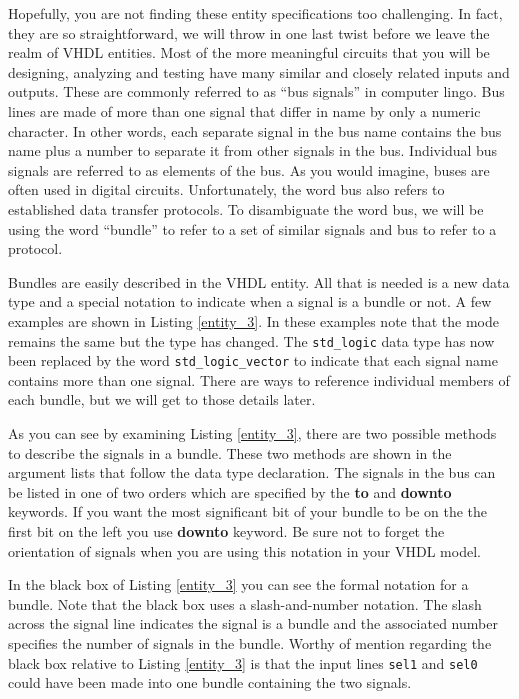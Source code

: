 Hopefully, you are not finding these entity specifications too challenging. In fact, they are so straightforward, we will throw in one last twist before we leave the realm of VHDL entities. Most of the more meaningful circuits that you will be designing, analyzing and testing have many similar and closely related inputs and outputs. These are commonly referred to as ``bus signals'' in computer lingo. Bus lines are made of more than one signal that differ in name by only a numeric character. In other words, each separate signal in the bus name contains the bus name plus a number to separate it from other signals in the bus. Individual bus signals are referred to as elements of the bus. As you would imagine, buses are often used in digital circuits. Unfortunately, the word bus also refers to established data transfer protocols. To disambiguate the word bus, we will be using the word ``bundle'' to refer to a set of similar signals and bus to refer to a protocol.

Bundles are easily described in the VHDL entity. All that is needed is a new data type and a special notation to indicate when a signal is a bundle or not. A few examples are shown in Listing \ref{entity_3}. In these examples note that the mode remains the same but the type has changed. The \texttt{std\_logic} data type has now been replaced by the word \texttt{std\_logic\_vector} to indicate that each signal name contains more than one signal. There are ways to reference individual members of each bundle, but we will get to those details later.

As you can see by examining Listing \ref{entity_3}, there are two possible methods to describe the signals in a bundle. These two methods are shown in the argument lists that follow the data type declaration. The signals in the bus can be listed in one of two orders which are specified by the \textbf{to} and \textbf{downto} keywords. If you want the most significant bit of your bundle to be on the the first bit on the left you use \textbf{downto} keyword. Be sure not to forget the orientation of signals when you are using this notation in your VHDL model.

In the black box of Listing \ref{entity_3} you can see the formal notation for a bundle. Note that the black box uses a slash-and-number notation. The slash across the signal line indicates the signal is a bundle and the associated number specifies the number of signals in the bundle. Worthy of mention regarding the black box relative to Listing \ref{entity_3} is that the input lines \texttt{sel1} and \texttt{sel0} could have been made into one bundle containing the two signals.

